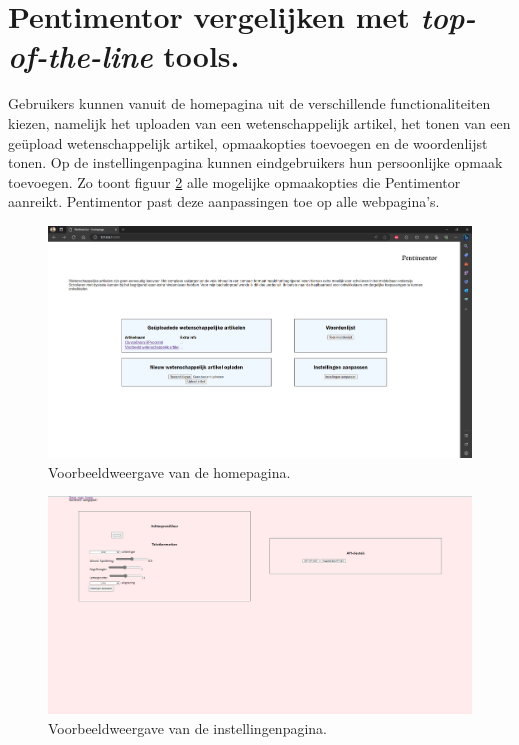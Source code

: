 \section{Pentimentor vergelijken met \textit{top-of-the-line} tools.}

Gebruikers kunnen vanuit de homepagina uit de verschillende functionaliteiten kiezen, namelijk het uploaden van een wetenschappelijk artikel, het tonen van een geüpload wetenschappelijk artikel, opmaakopties toevoegen en de woordenlijst tonen. Op de instellingenpagina kunnen eindgebruikers hun persoonlijke opmaak toevoegen. Zo toont figuur \ref{img:website-instellingen} alle mogelijke opmaakopties die Pentimentor aanreikt. Pentimentor past deze aanpassingen toe op alle webpagina's.

\begin{center}
	\begin{figure}[H]
		\includegraphics[width=\linewidth]{img/homepagina.png}
		\caption{Voorbeeldweergave van de homepagina.}
		\label{img:homepagina}
	\end{figure}
\end{center}

\begin{center}
    \begin{figure}[H]
        \includegraphics[width=\linewidth]{img/website-instellingen.png}
        \caption{Voorbeeldweergave van de instellingenpagina.}
        \label{img:website-instellingen}
    \end{figure}
\end{center}

